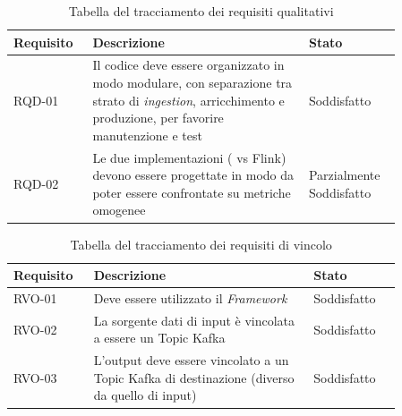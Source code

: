 \newpage
\begin{table}[H]
\setlength{\tabcolsep}{10pt} %
\def\arraystretch{1.5} %
\centering
\begin{tabular}{|p{0.16\linewidth}|p{0.50\linewidth}|p{0.2\linewidth}|}
\hline
\textbf{Requisito} & \textbf{Descrizione} & \textbf{Stato} \\ \hline
RQD-01 & Il codice deve essere organizzato in modo modulare, con separazione tra strato di \textit{ingestion}, arricchimento e produzione, per favorire manutenzione e test & Soddisfatto \\ \hline
RQD-02 & Le due implementazioni (\nameref{Spring} vs Flink) devono essere progettate in modo da poter essere confrontate su metriche omogenee & Parzialmente Soddisfatto \\ \hline

\end{tabular}
\caption{Tabella del tracciamento dei requisiti qualitativi}
\label{Tabella del tracciamento dei requisiti qualitativi}
\end{table}

\begin{table}[H]
\setlength{\tabcolsep}{10pt} %
\def\arraystretch{1.5} %
\centering
\begin{tabular}{|p{0.16\linewidth}|p{0.50\linewidth}|p{0.2\linewidth}|}
\hline
\textbf{Requisito} & \textbf{Descrizione} & \textbf{Stato} \\ \hline
RVO-01 & Deve essere utilizzato il \textit{\gls{Framework}} \nameref{Spring} & Soddisfatto \\ \hline
RVO-02 & La sorgente dati di input è vincolata a essere un \gls{Topic Kafka} & Soddisfatto \\ \hline
RVO-03 & L'output deve essere vincolato a un \gls{Topic Kafka} di destinazione (diverso da quello di input) & Soddisfatto \\ \hline
\end{tabular}
\caption{Tabella del tracciamento dei requisiti di vincolo}
\label{Tabella del tracciamento dei requisiti di vincolo}
\end{table}


